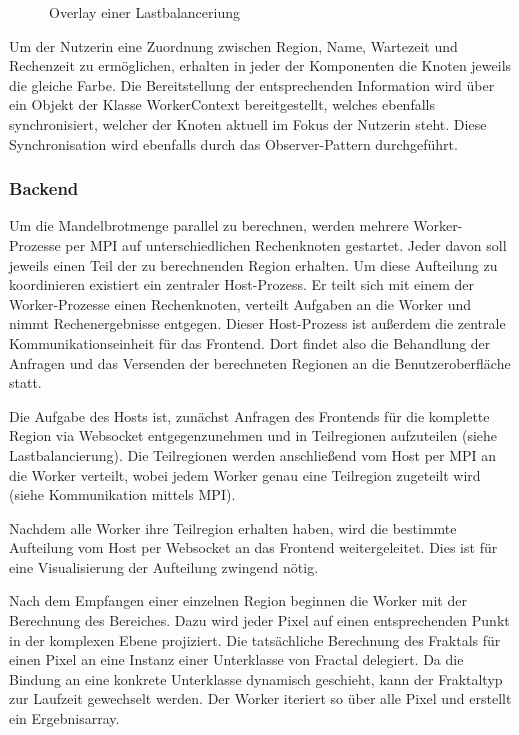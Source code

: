 \begin{figure}
    \centering
        \caption{Overlay einer Lastbalanceriung}
    \label{fig:visualisierung_lastbalancierung}
\end{figure}

Um der Nutzerin eine Zuordnung zwischen Region, Name, Wartezeit und Rechenzeit zu ermöglichen, erhalten in jeder der Komponenten die Knoten jeweils die gleiche Farbe. Die Bereitstellung der entsprechenden Information wird über ein Objekt der Klasse WorkerContext bereitgestellt, welches ebenfalls synchronisiert, welcher der Knoten aktuell im Fokus der Nutzerin steht. Diese Synchronisation wird ebenfalls durch das Observer-Pattern durchgeführt.

\subsubsection{Backend}

Um die Mandelbrotmenge parallel zu berechnen, werden mehrere Worker-Prozesse per MPI auf unterschiedlichen Rechenknoten gestartet. Jeder davon soll jeweils einen Teil der zu berechnenden Region erhalten. Um diese Aufteilung zu koordinieren existiert ein zentraler Host-Prozess. Er teilt sich mit einem der Worker-Prozesse einen Rechenknoten, verteilt Aufgaben an die Worker und nimmt Rechenergebnisse entgegen. Dieser Host-Prozess ist außerdem die zentrale Kommunikationseinheit für das Frontend. Dort findet also die Behandlung der Anfragen und das Versenden der berechneten Regionen an die Benutzeroberfläche statt.

Die Aufgabe des Hosts ist, zunächst Anfragen des Frontends für die komplette Region via Websocket entgegenzunehmen und in Teilregionen aufzuteilen (siehe Lastbalancierung). Die Teilregionen werden anschließend vom Host per MPI an die Worker verteilt, wobei jedem Worker genau eine Teilregion zugeteilt wird (siehe Kommunikation mittels MPI).

Nachdem alle Worker ihre Teilregion erhalten haben, wird die bestimmte Aufteilung vom Host per Websocket an das Frontend weitergeleitet. Dies ist für eine Visualisierung der Aufteilung zwingend nötig.

Nach dem Empfangen einer einzelnen Region beginnen die Worker mit der Berechnung des Bereiches. Dazu wird jeder Pixel auf einen entsprechenden Punkt in der komplexen Ebene projiziert. Die tatsächliche Berechnung des Fraktals für einen Pixel an eine Instanz einer Unterklasse von Fractal delegiert. Da die Bindung an eine konkrete Unterklasse dynamisch geschieht, kann der Fraktaltyp zur Laufzeit gewechselt werden. Der Worker iteriert so über alle Pixel und erstellt ein Ergebnisarray.

